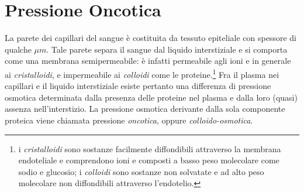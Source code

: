 \section{Pressione Oncotica}
La parete dei capillari del sangue è costituita da tessuto epiteliale con spessore di qualche $\mu m$. Tale parete separa il sangue dal liquido interstiziale e si comporta come una membrana semipermeabile: è infatti permeabile agli ioni e in generale ai \textit{cristalloidi}, e impermeabile ai \textit{colloidi} come le proteine.\footnote{i \textit{cristalloidi} sono sostanze facilmente diffondibili attraverso la membrana endoteliale e comprendono ioni e composti a basso peso molecolare come sodio e glucosio; i \textit{colloidi} sono sostanze non solvatate e ad alto peso molecolare non diffondibili attraverso l'endotelio.}
Fra il plasma nei capillari e il liquido interstiziale esiste pertanto una differenza di pressione osmotica determinata dalla presenza delle proteine nel plasma e dalla loro (quasi) assenza nell'interstizio. La pressione osmotica derivante dalla sola componente proteica viene chiamata pressione \textit{oncotica}, oppure \textit{colloido-osmotica}.


